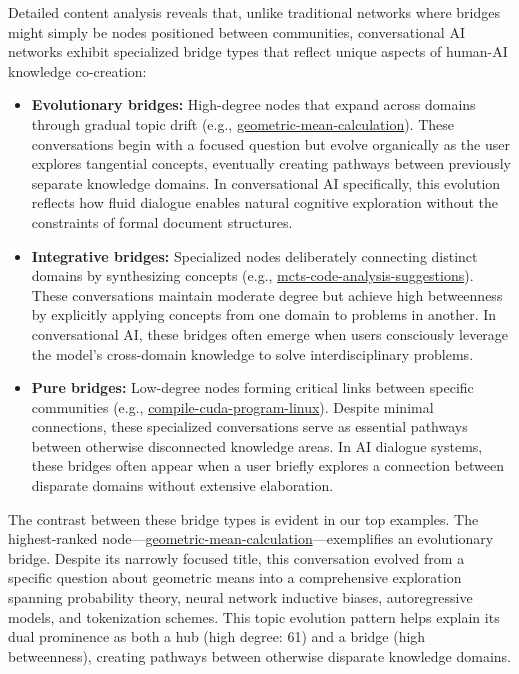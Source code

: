 \documentclass[10pt, a4paper]{article}
\begin{document}
Detailed content analysis reveals that, unlike traditional networks where bridges might simply be nodes positioned between communities, conversational AI networks exhibit specialized bridge types that reflect unique aspects of human-AI knowledge co-creation:

\begin{itemize}
    \item \textbf{Evolutionary bridges:} High-degree nodes that expand across domains through gradual topic drift (e.g., \url{geometric-mean-calculation}). These conversations begin with a focused question but evolve organically as the user explores tangential concepts, eventually creating pathways between previously separate knowledge domains. In conversational AI specifically, this evolution reflects how fluid dialogue enables natural cognitive exploration without the constraints of formal document structures.
    
    \item \textbf{Integrative bridges:} Specialized nodes deliberately connecting distinct domains by synthesizing concepts (e.g., \url{mcts-code-analysis-suggestions}). These conversations maintain moderate degree but achieve high betweenness by explicitly applying concepts from one domain to problems in another. In conversational AI, these bridges often emerge when users consciously leverage the model's cross-domain knowledge to solve interdisciplinary problems.
    
    \item \textbf{Pure bridges:} Low-degree nodes forming critical links between specific communities (e.g., \url{compile-cuda-program-linux}). Despite minimal connections, these specialized conversations serve as essential pathways between otherwise disconnected knowledge areas. In AI dialogue systems, these bridges often appear when a user briefly explores a connection between disparate domains without extensive elaboration.
\end{itemize}

The contrast between these bridge types is evident in our top examples. The highest-ranked node---\url{geometric-mean-calculation}---exemplifies an evolutionary bridge. Despite its narrowly focused title, this conversation evolved from a specific question about geometric means into a comprehensive exploration spanning probability theory, neural network inductive biases, autoregressive models, and tokenization schemes. This topic evolution pattern helps explain its dual prominence as both a hub (high degree: 61) and a bridge (high betweenness), creating pathways between otherwise disparate knowledge domains.
\end{document}
